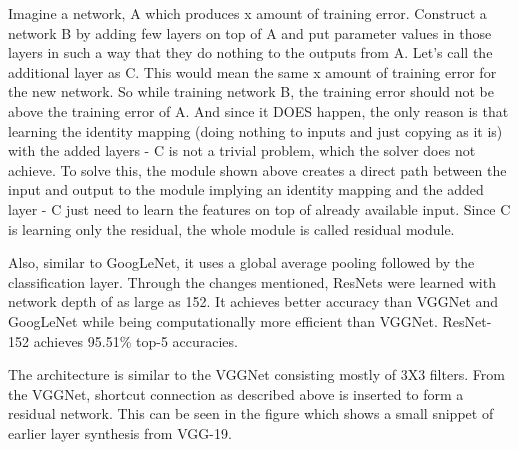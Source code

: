Imagine a network, A which produces x amount of training error. Construct a network B by adding few layers on top of A and put parameter values in those layers in such a way that they do nothing to the outputs from A. Let’s call the additional layer as C. This would mean the same x amount of training error for the new network. So while training network B, the training error should not be above the training error of A. And since it DOES happen, the only reason is that learning the identity mapping (doing nothing to inputs and just copying as it is) with the added layers - C is not a trivial problem, which the solver does not achieve. To solve this, the module shown above creates a direct path between the input and output to the module implying an identity mapping and the added layer - C just need to learn the features on top of already available input. Since C is learning only the residual, the whole module is called residual module.
 
Also, similar to GoogLeNet, it uses a global average pooling followed by the classification layer. Through the changes mentioned, ResNets were learned with network depth of as large as 152. It achieves better accuracy than VGGNet and GoogLeNet while being computationally more efficient than VGGNet. ResNet-152 achieves 95.51\% top-5 accuracies.
 
The architecture is similar to the VGGNet consisting mostly of 3X3 filters. From the VGGNet, shortcut connection as described above is inserted to form a residual network. This can be seen in the figure which shows a small snippet of earlier layer synthesis from VGG-19.

